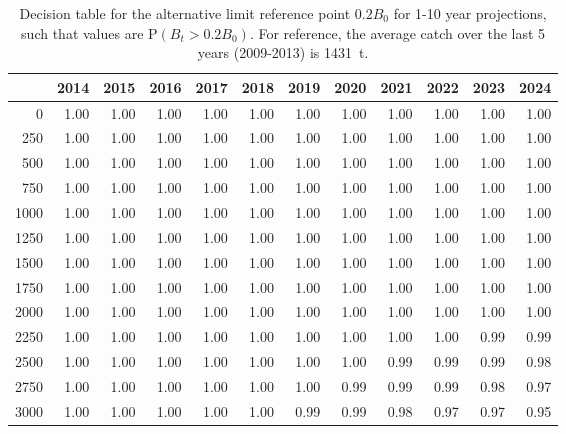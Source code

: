 \documentclass[11pt]{book}
\begin{document}
\begin{table}[!ht]
\centering
\caption{Decision table for the alternative limit reference point $0.2 B_0$ for 1-10 year projections, such that values are P$(B_t > 0.2 B_0)$. For reference, the average catch over the last 5 years (2009-2013) is 1431~t.} 
\label{tab:B0_0.2}
\begin{tabular}{rrrrrrrrrrrr}
  \\[-1.0ex] \hline
 & 2014 & 2015 & 2016 & 2017 & 2018 & 2019 & 2020 & 2021 & 2022 & 2023 & 2024 \\ 
  \hline
0 & 1.00 & 1.00 & 1.00 & 1.00 & 1.00 & 1.00 & 1.00 & 1.00 & 1.00 & 1.00 & 1.00 \\ 
  250 & 1.00 & 1.00 & 1.00 & 1.00 & 1.00 & 1.00 & 1.00 & 1.00 & 1.00 & 1.00 & 1.00 \\ 
  500 & 1.00 & 1.00 & 1.00 & 1.00 & 1.00 & 1.00 & 1.00 & 1.00 & 1.00 & 1.00 & 1.00 \\ 
  750 & 1.00 & 1.00 & 1.00 & 1.00 & 1.00 & 1.00 & 1.00 & 1.00 & 1.00 & 1.00 & 1.00 \\ 
  1000 & 1.00 & 1.00 & 1.00 & 1.00 & 1.00 & 1.00 & 1.00 & 1.00 & 1.00 & 1.00 & 1.00 \\ 
  1250 & 1.00 & 1.00 & 1.00 & 1.00 & 1.00 & 1.00 & 1.00 & 1.00 & 1.00 & 1.00 & 1.00 \\ 
  1500 & 1.00 & 1.00 & 1.00 & 1.00 & 1.00 & 1.00 & 1.00 & 1.00 & 1.00 & 1.00 & 1.00 \\ 
  1750 & 1.00 & 1.00 & 1.00 & 1.00 & 1.00 & 1.00 & 1.00 & 1.00 & 1.00 & 1.00 & 1.00 \\ 
  2000 & 1.00 & 1.00 & 1.00 & 1.00 & 1.00 & 1.00 & 1.00 & 1.00 & 1.00 & 1.00 & 1.00 \\ 
  2250 & 1.00 & 1.00 & 1.00 & 1.00 & 1.00 & 1.00 & 1.00 & 1.00 & 1.00 & 0.99 & 0.99 \\ 
  2500 & 1.00 & 1.00 & 1.00 & 1.00 & 1.00 & 1.00 & 1.00 & 0.99 & 0.99 & 0.99 & 0.98 \\ 
  2750 & 1.00 & 1.00 & 1.00 & 1.00 & 1.00 & 1.00 & 0.99 & 0.99 & 0.99 & 0.98 & 0.97 \\ 
  3000 & 1.00 & 1.00 & 1.00 & 1.00 & 1.00 & 0.99 & 0.99 & 0.98 & 0.97 & 0.97 & 0.95 \\ 
   \hline
\end{tabular}
\end{table}
\end{document}
